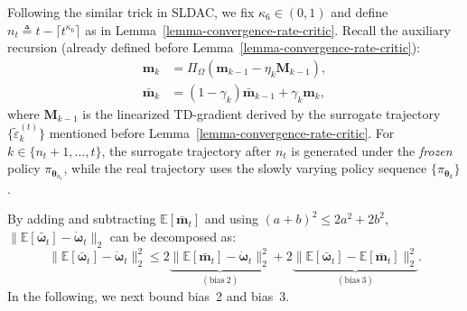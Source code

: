 \documentclass{IEEEtran}
\begin{document}
Following the similar trick in SLDAC, we fix $\kappa_6\in(0,1)$ and define $n_t\triangleq t-\lceil t^{\kappa_6}\rceil$ as in Lemma~\ref{lemma-convergence-rate-critic}.
Recall the auxiliary recursion (already defined before Lemma~\ref{lemma-convergence-rate-critic}):
\begin{equation}
\begin{aligned}
\boldsymbol{m}_{k}
&=\Pi_{\Omega}\!\left(\boldsymbol{m}_{k-1}-\eta_{k}\boldsymbol{M}_{k-1}\right),\\
\bar{\boldsymbol{m}}_{k}
&=(1-\gamma_{k})\bar{\boldsymbol{m}}_{k-1}+\gamma_{k}\boldsymbol{m}_{k},
\end{aligned}
\label{eq:appB_aux_update}
\end{equation}
where $\boldsymbol{M}_{k-1}$ is the linearized TD-gradient derived by the surrogate trajectory $\{\tilde\varepsilon_{k}^{(t)}\}$ mentioned before Lemma~\ref{lemma-convergence-rate-critic}. 
For $k\in\{n_t+1,\ldots,t\}$, the surrogate trajectory after $n_t$ is generated under the \emph{frozen} policy $\pi_{\boldsymbol{\theta}_{n_t}}$, while the real trajectory uses the slowly varying policy sequence $\{\pi_{\boldsymbol{\theta}_{k}}\}$.

By adding and subtracting $\mathbb{E}[\bar{\boldsymbol{m}}_{t}]$ and using $(a+b)^2\le 2a^2+2b^2$, $\|\mathbb{E}[\bar{\boldsymbol{\omega}}_{t}]-\dot{\boldsymbol{\omega}}_{t}\|_2$ can be decomposed as: 
\begin{equation}
\bigl\|\mathbb{E}[\bar{\boldsymbol{\omega}}_{t}]-\dot{\boldsymbol{\omega}}_{t}\bigr\|_2^2
\le 2\underbrace{\bigl\|\mathbb{E}[\bar{\boldsymbol{m}}_{t}]-\dot{\boldsymbol{\omega}}_{t}\bigr\|_2^2}_{\mathrm{(bias\ 2)}}
+2\underbrace{\bigl\|\mathbb{E}[\bar{\boldsymbol{\omega}}_{t}]-\mathbb{E}[\bar{\boldsymbol{m}}_{t}]\bigr\|_2^2}_{\mathrm{(bias\ 3)}}.
\label{eq:appB_bias23_split}
\end{equation}
In the following, we next bound bias~2 and bias~3.
\end{document}
